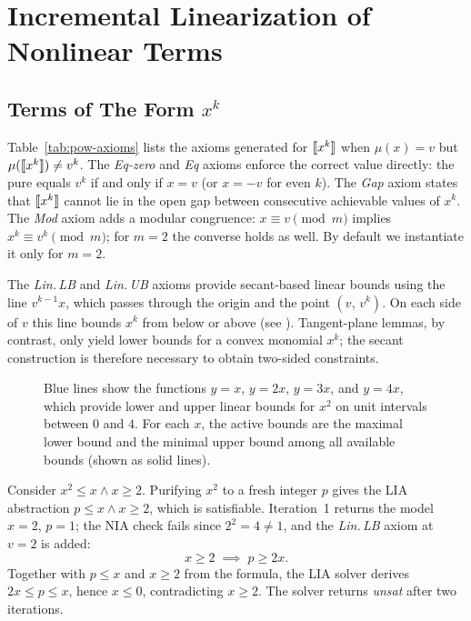 \section{Incremental Linearization of Nonlinear Terms}\label{sec:axioms}

\subsection{Terms of The Form $x^k$}



Table~\ref{tab:pow-axioms} lists the axioms generated for $\llbracket x^k \rrbracket$ when $\mu(x) = v$ but
$\mu(\llbracket x^k \rrbracket) \neq v^k$.
The \textit{Eq-zero} and \textit{Eq} axioms enforce the correct value directly: the pure equals $v^k$
if and only if $x = v$ (or $x = -v$ for even $k$).
The \textit{Gap} axiom states that $\llbracket x^k \rrbracket$ cannot lie in the open gap between consecutive achievable values of $x^k$.
The \textit{Mod} axiom adds a modular congruence: $x \equiv v \pmod{m}$ implies
$x^k \equiv v^k \pmod{m}$; for $m = 2$ the converse holds as well.
By default we instantiate it only for $m = 2$.

The \textit{Lin.\,LB} and \textit{Lin.\,UB} axioms provide secant-based linear bounds using the
line $v^{k-1}x$, which passes through the origin and the point $(v,\,v^k)$.
On each side of $v$ this line bounds $x^k$ from below or above (see ).
Tangent-plane lemmas, by contrast, only yield lower bounds for a convex monomial $x^k$;
the secant construction is therefore necessary to obtain two-sided constraints.

\begin{figure}[ht]
	\centering
	
	\caption{
		Blue lines show the functions $y=x$, $y=2x$, $y=3x$, and $y=4x$, which provide lower and upper linear bounds
		for $x^2$ on unit intervals between $0$ and $4$. For each $x$, the active bounds are the maximal lower bound
		and the minimal upper bound among all available bounds (shown as solid lines).}\label{fig:secant}
\end{figure}

\begin{example}
Consider $x^2 \leq x \land x \geq 2$.
Purifying $x^2$ to a fresh integer $p$ gives the LIA abstraction $p \leq x \land x \geq 2$,
which is satisfiable.
Iteration~1 returns the model $x = 2$, $p = 1$; the NIA check fails since $2^2 = 4 \neq 1$,
and the \textit{Lin.\,LB} axiom at $v = 2$ is added:
\[
  x \geq 2 \;\implies\; p \geq 2x.
\]
Together with $p \leq x$ and $x \geq 2$ from the formula, the LIA solver derives
$2x \leq p \leq x$, hence $x \leq 0$, contradicting $x \geq 2$.
The solver returns \textit{unsat} after two iterations.
\end{example}

